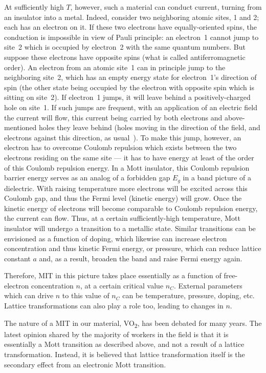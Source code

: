 \documentclass[11pt,a4paper]{article}
\newcommand{\VOtwo}{VO\textsubscript{2}}
\begin{document}
At sufficiently high $T$, however, such a material can conduct current, turning
from an insulator into a metal. Indeed, consider two neighboring atomic sites,
1 and 2; each has an electron on it. If these two electrons have equally-oriented
spins, the conduction is impossible in view of Pauli principle: an electron~1
cannot jump to site~2 which is occupied by electron~2 with the same quantum
numbers. But suppose these electrons have opposite spins (what is called
antiferromagnetic order). An electron from an atomic site~1 can in principle jump
to the neighboring site~2, which has an empty energy state for electron~1's
direction of spin (the other state being occupied by the electron with opposite
spin which is sitting on site~2). If electron~1 jumps, it will leave behind a
positively-charged hole on site~1. If such jumps are frequent, with an application
of an electric field the current will flow, this current being carried by both
electrons and above-mentioned holes they leave behind (holes moving in the
direction of the field, and electrons against this direction, as
usual~\cite{ref:ashcroft}). To make this jump, however, an electron has to overcome
Coulomb repulsion which exists between the two electrons residing on the same site
--- it has to have energy at least of the order of this Coulomb repulsion energy.
In a Mott insulator, this Coulomb repulsion barrier energy serves as an analog of a
forbidden gap $E_g$ in a band picture of a dielectric. With raising temperature
more electrons will be excited across this Coulomb gap, and thus the Fermi level
(kinetic energy) will grow. Once the kinetic energy of electrons will become
comparable to Coulomb repulsion energy, the current can flow. Thus, at a certain
sufficiently-high temperature, Mott insulator will undergo a transition to a
metallic state. Similar transitions can be envisioned as a function of doping,
which likewise can increase electron concentration and thus kinetic Fermi energy,
or pressure, which can reduce lattice constant $a$ and, as a result, broaden the
band and raise Fermi energy again.

Therefore, MIT in this picture takes place essentially as a function of
free-electron concentration $n$, at a certain critical value $n_C$. External
parameters which can drive $n$ to this value of $n_C$ can be temperature, pressure,
doping, etc. Lattice transformations can also play a role too, leading to changes
in $n$.

The nature of a MIT in our material, \VOtwo, has been debated for many years. The
latest opinion shared by the majority of workers in the field is that it is
essentially a Mott transition as described above, and not a result of a lattice
transformation. Instead, it is believed that lattice transformation itself is the
secondary effect from an electronic Mott transition.
\end{document}
